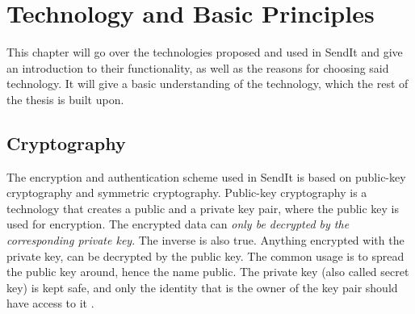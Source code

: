 %
\chapter{Technology and Basic Principles} %
\label{Chapter2} %
%
        







        


    
%
%
This chapter will go over the technologies proposed and used in SendIt and give an introduction to their functionality, as well as the reasons for choosing said technology. It will give a basic understanding of the technology, which the rest of the thesis is built upon.
%
\section{Cryptography}
\label{sec:pkc}
%
    The encryption and authentication scheme used in SendIt is based on public-key cryptography and symmetric cryptography. Public-key cryptography is a technology that creates a public and a private key pair, where the public key is used for encryption. The encrypted data can \emph{only be decrypted by the corresponding private key}. The inverse is also true. Anything encrypted with the private key, can be decrypted by the public key. The common usage is to spread the public key around, hence the name public. The private key (also called secret key) is kept safe, and only the identity that is the owner of the key pair should have access to it \cite{trcekManagingInformationSystems2006}.

